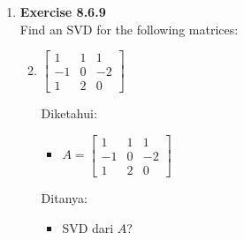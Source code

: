 \documentclass[12pt, a4paper]{scrartcl}
\begin{document}
\begin{enumerate}
\begin{enumerate}
            \end{enumerate}
            
            \item \textbf{Exercise 8.6.9}\\Find an SVD for the following matrices:
            \begin{enumerate}
                \setcounter{enumii}{1}
                \item $\begin{bmatrix}
                    1 & 1 & 1\\
                    -1 & 0 & -2\\
                    1 & 2 & 0
                \end{bmatrix}$
                
                Diketahui:
                \begin{itemize}
                    \item[] $A=\begin{bmatrix}
                        1 & 1 & 1\\
                        -1 & 0 & -2\\
                        1 & 2 & 0
                    \end{bmatrix}$
                \end{itemize}

                Ditanya:
                \begin{itemize}
                    \item SVD dari $A$?
                \end{itemize}


\end{enumerate}
\end{enumerate}
\end{document}
